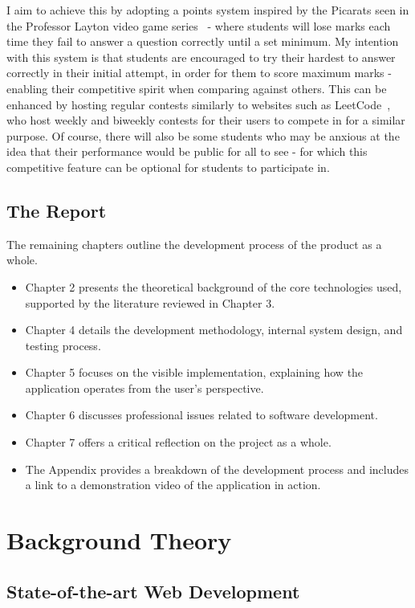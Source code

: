 \documentclass[]{final_report}
\begin{document}
I aim to achieve this by adopting a points system inspired by the Picarats seen in the Professor Layton video game series~\cite{LAYTON} - where students will lose marks each time they fail to answer a question correctly until a set minimum. My intention with this system is that students are encouraged to try their hardest to answer correctly in their initial attempt, in order for them to score maximum marks - enabling their competitive spirit when comparing against others. This can be enhanced by hosting regular contests similarly to websites such as LeetCode~\cite{LEETCODE}, who host weekly and biweekly contests for their users to compete in for a similar purpose. Of course, there will also be some students who may be anxious at the idea that their performance would be public for all to see - for which this competitive feature can be optional for students to participate in. 
\section{The Report}

The remaining chapters outline the development process of the product as a whole.

\begin{itemize}
	\item Chapter 2 presents the theoretical background of the core technologies used, supported by the literature reviewed in Chapter 3.
	\item Chapter 4 details the development methodology, internal system design, and testing process.
	\item Chapter 5 focuses on the visible implementation, explaining how the application operates from the user's perspective.
	\item Chapter 6 discusses professional issues related to software development.
	\item Chapter 7 offers a critical reflection on the project as a whole.
	\item The Appendix provides a breakdown of the development process and includes a link to a demonstration video of the application in action.
\end{itemize}

\chapter{Background Theory}
\section{State-of-the-art Web Development}
\end{document}
